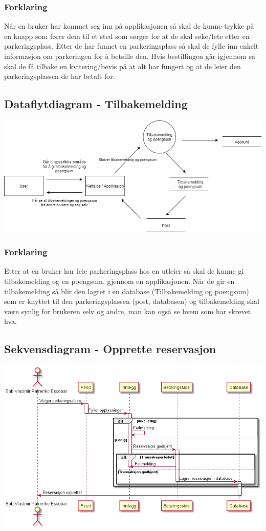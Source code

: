 \documentclass[12pt]{article}
\begin{document}
            \subsubsection{Forklaring}
            Når en bruker har kommet seg inn på applikasjonen så skal de kunne trykke på en knapp som fører dem til et sted som sørger for at de skal søke/lete etter en parkeringsplass. Etter de har funnet en parkeringsplass så skal de fylle inn enkelt informasjon om parkeringen for å betsille den. Hvis bestillingen går igjennom så skal de få tilbake en kvitering/bevis på at alt har fungert og at de leier den parkeringsplassen de har betalt for.

    

    \subsection{Dataflytdiagram - Tilbakemelding}
    \includegraphics[max width=\textwidth]{bilder/diagrammer/dataflyt_tilbakemelding.png}
        \subsubsection{Forklaring}
        Etter at en bruker har leie parkeringsplass hos en utleier så skal de kunne gi tilbakemelding og en poengsum, gjennom en applikasjonen. Når de gir en tilbakemelding så blir den lagret i en database (Tilbakemelding og poengsum) som er knyttet til den parkeringsplassen (post, databasen) og tilbakemelding skal være synlig for brukeren selv og andre, man kan også se hvem som har skrevet hva.

    \subsection{Sekvensdiagram - Opprette reservasjon}
    \includegraphics[max width=\textwidth]{bilder/diagrammer/sekvens_opprette reservasjon.png}
\end{document}
